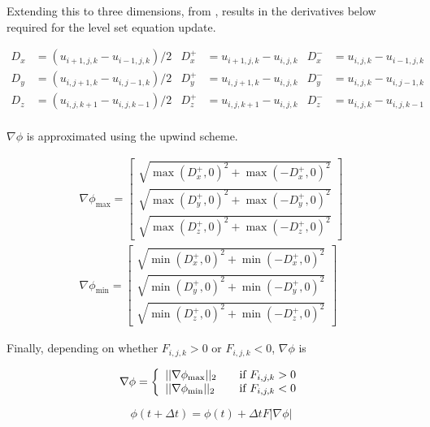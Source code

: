 Extending this to three dimensions, from \cite{Lefohn04astreaming}, results in the derivatives below required for the level set equation update. 

\begin{align}
	D_x &= (u_{i+1,j,k}-u_{i-1,j,k})/2 & D_x^+ &= u_{i+1,j,k}-u_{i,j,k} & D_x^- &= u_{i,j,k}-u_{i-1,j,k} \nonumber\\
	D_y &= (u_{i,j+1,k}-u_{i,j-1,k})/2 & D_y^+ &= u_{i,j+1,k}-u_{i,j,k} &	D_y^- &= u_{i,j,k}-u_{i,j-1,k} \nonumber\\
	D_z &= (u_{i,j,k+1}-u_{i,j,k-1})/2 & D_z^+ &= u_{i,j,k+1}-u_{i,j,k} &	D_z^- &= u_{i,j,k}-u_{i,j,k-1} \nonumber\\
\end{align}

$\nabla\phi$ is approximated using the upwind scheme.

\begin{align}
\nabla\phi_{\max} = \left[
  \begin{array}{ c }
     \sqrt{\max(D_x^+, 0)^2 + \max(-D_x^+,0)^2}  \\[2em]
     \sqrt{\max(D_y^+, 0)^2 + \max(-D_y^+,0)^2}  \\[2em]
     \sqrt{\max(D_z^+, 0)^2 + \max(-D_z^+,0)^2}  
  \end{array} \right]
\\[2em]
\nabla\phi_{\min} = \left[
  \begin{array}{ c }
     \sqrt{\min(D_x^+, 0)^2 + \min(-D_x^+,0)^2}  \\[2em]
     \sqrt{\min(D_y^+, 0)^2 + \min(-D_y^+,0)^2}  \\[2em]
     \sqrt{\min(D_z^+, 0)^2 + \min(-D_z^+,0)^2} 
  \end{array} \right]
\end{align}

Finally, depending on whether $F_{i,j,k} > 0$ or $F_{i,j,k} < 0$, $\nabla\phi$ is 

\begin{equation}
\nabla\phi = \left\{ 
\begin{array}{l l}
  ||\nabla\phi_{\max}||_2 & \quad \mbox{if $F_{i,j,k} > 0$}\\
  ||\nabla\phi_{\min}||_2 & \quad \mbox{if $F_{i,j,k} < 0$}\\ \end{array} \right.
\label{eq:finalchoice}
\end{equation}

\begin{equation}
\phi(t+\Delta t) =\phi(t) + \Delta t F|\nabla\phi|
\label{eq:phi}
\end{equation}

